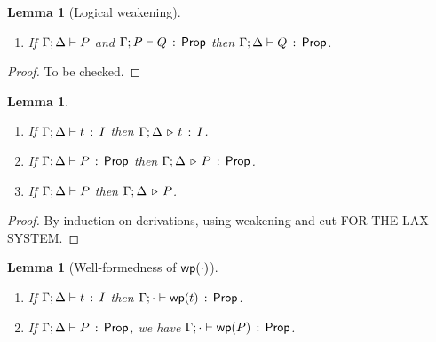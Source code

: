 \documentclass[10pt,a4paper]{article}
\newtheorem{lemma}[theorem]{Lemma}
\begin{document}
\begin{lemma}[Logical weakening]
\label{lemma:logweak}
\mbox{}
\begin{enumerate}
\item If $\Gamma;\Delta \vdash P$ and $\Gamma;P \vdash Q\, :\, \mathsf{Prop}$ then
  $\Gamma;\Delta \vdash Q\, :\, \mathsf{Prop}$.
\end{enumerate}
\end{lemma}

\begin{proof}
  To be checked.
\end{proof}

\begin{lemma}
\mbox{}
\begin{enumerate}
  \item If $\Gamma;\Delta \vdash t\, :\, I$ then 
    $\Gamma;\Delta \,\triangleright\, t\, :\, I$.
  \item If $\Gamma;\Delta \vdash P\, :\, \mathsf{Prop}$ then
    $\Gamma;\Delta \,\triangleright\, P\,:\, \mathsf{Prop}$.
  \item If $\Gamma;\Delta \vdash P$ then
    $\Gamma;\Delta \,\triangleright\, P$.
\end{enumerate}
\end{lemma}

\begin{proof}
By induction on derivations, using weakening and cut FOR THE LAX SYSTEM.
\end{proof}


\begin{lemma}[Well-formedness of  $\mathop{\mathsf{wp}}(\cdot)$]
\label{lemma:wfwp}
\mbox{}
  \begin{enumerate}
  \item If $\Gamma;\Delta \vdash t\, :\, I$ then
    $\Gamma;\cdot \vdash \mathop{\mathsf{wp}}(t)\, :\, \mathsf{Prop}$.
  \item If $\Gamma;\Delta \vdash P\, :\, \mathsf{Prop}$, we have
    $\Gamma;\cdot \vdash \mathop{\mathsf{wp}}(P)\, :\, \mathsf{Prop}$.
  \end{enumerate}
\end{lemma}
\end{document}

